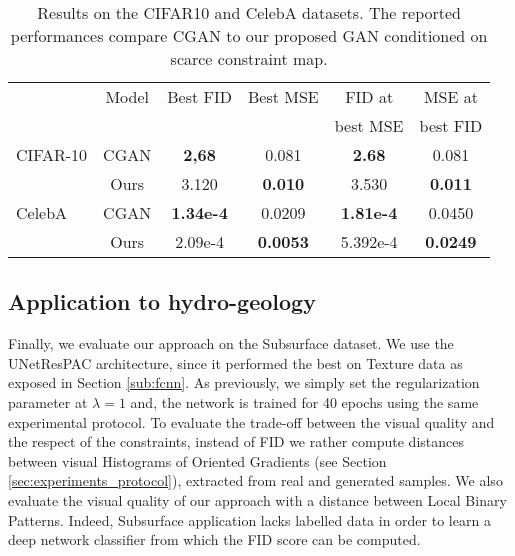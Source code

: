 \begin{table}
	\centering
	\begin{tabular}{|l|c|c|c|c|c|}
		\hline
		&Model           & Best FID & Best MSE & FID at & MSE at \\
		&&&&best MSE & best FID \\
		\hline
		CIFAR-10 &CGAN   & \textbf{2,68}  & 0.081  & \textbf{2.68}  & 0.081\\
		&Ours            & 3.120 & \textbf{0.010} & 3.530 & \textbf{0.011} \\    
		\hline
		CelebA &CGAN      & \textbf{1.34e-4} & 0.0209 &  \textbf{1.81e-4} & 0.0450\\
		&Ours            & 2.09e-4& \textbf{0.0053} & 5.392e-4 & \textbf{0.0249} \\
		\hline
	\end{tabular}
	
	\caption{Results on the CIFAR10 and CelebA datasets. The reported performances compare CGAN to our proposed GAN conditioned on scarce constraint map.}
	\label{tab:cifar10}
\end{table}

\vspace{0.4cm}

\subsection{Application to hydro-geology}

Finally, we evaluate our approach on the Subsurface dataset. We use the UNetResPAC  architecture, since it performed the best on Texture data as exposed in Section \ref{sub:fcnn}. As previously, we simply set the regularization parameter at $\lambda=1$ and, the network is trained for 40 epochs using the same experimental protocol. To evaluate the trade-off between the visual quality and the respect of the constraints, instead of FID we rather compute distances between visual Histograms of Oriented Gradients (see Section \ref{sec:experiments_protocol}), extracted from real and generated samples. We also evaluate the visual quality of our approach with a distance between Local Binary Patterns. Indeed, Subsurface application lacks labelled data in order to learn a deep network classifier from which the FID score can be computed. 


